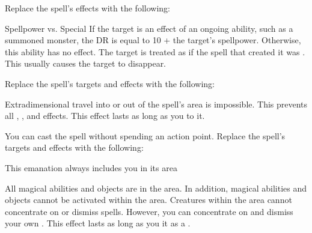 Replace the spell's effects with the following:
\begin{spellcontent}
\begin{augmenteffects}
\begin{spellattack}{Spellpower vs. Special}
\spellspecial
If the target is an effect of an ongoing  ability, such as a summoned monster, the DR is equal to 10 + the target's spellpower.
Otherwise, this ability has no effect.
\spellsuccess
The target is treated as if the spell that created it was .
This usually causes the target to disappear.
\end{spellattack}
\end{augmenteffects}
\end{spellcontent}
Replace the spell's targets and effects with the following:
\begin{spellcontent}
\begin{augmenttargetinginfo}
\end{augmenttargetinginfo}
\begin{augmenteffects}
\spelleffect
Extradimensional travel into or out of the spell's area is impossible.
This prevents all , , and  effects.
This effect lasts as long as you  to it.
\end{augmenteffects}
\end{spellcontent}
You can cast the spell without spending an action point.
Replace the spell's targets and effects with the following:
\begin{spellcontent}
\begin{augmenttargetinginfo}
\spellspecial This emanation always includes you in its area
\end{augmenttargetinginfo}
\begin{augmenteffects}
\spelleffect
All magical abilities and objects are  in the area.
In addition, magical abilities and objects cannot be activated within the area.
Creatures within the area cannot concentrate on or dismiss spells.
However, you can concentrate on and dismiss your own .
This effect lasts as long as you  it as a .
\end{augmenteffects}
\end{spellcontent}
